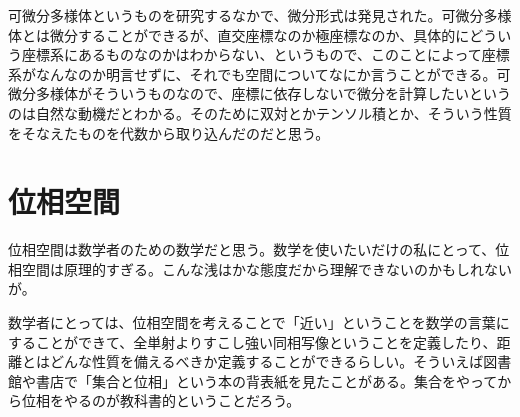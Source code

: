 可微分多様体というものを研究するなかで、微分形式は発見された。可微分多様体とは微分することができるが、直交座標なのか極座標なのか、具体的にどういう座標系にあるものなのかはわからない、というもので、このことによって座標系がなんなのか明言せずに、それでも空間についてなにか言うことができる。可微分多様体がそういうものなので、座標に依存しないで微分を計算したいというのは自然な動機だとわかる。そのために双対とかテンソル積とか、そういう性質をそなえたものを代数から取り込んだのだと思う。

\newpage


\section{位相空間}

位相空間は数学者のための数学だと思う。数学を使いたいだけの私にとって、位相空間は原理的すぎる。こんな浅はかな態度だから理解できないのかもしれないが。

数学者にとっては、位相空間を考えることで「近い」ということを数学の言葉にすることができて、全単射よりすこし強い同相写像ということを定義したり、距離とはどんな性質を備えるべきか定義することができるらしい。そういえば図書館や書店で「集合と位相」という本の背表紙を見たことがある。集合をやってから位相をやるのが教科書的ということだろう。

\newpage

\newpage

